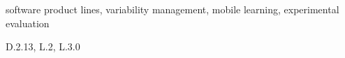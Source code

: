\documentclass[10pt,a4paper]{article}
\begin{document}
\begin{keywords}
software product lines, variability management, mobile learning, experimental evaluation
\end{keywords}

\begin{category}
D.2.13, L.2, L.3.0
\end{category}















\end{document}
